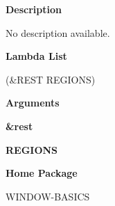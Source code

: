  
{\bf Description}

No description available.

 
{\bf Lambda List}

(\&REST REGIONS)

 
{\bf Arguments}


\beginhang
{\bf \&rest}\hspace{2em}
 
{\bf REGIONS}


 
\endhang
 
{\bf Home Package}

WINDOW-BASICS

